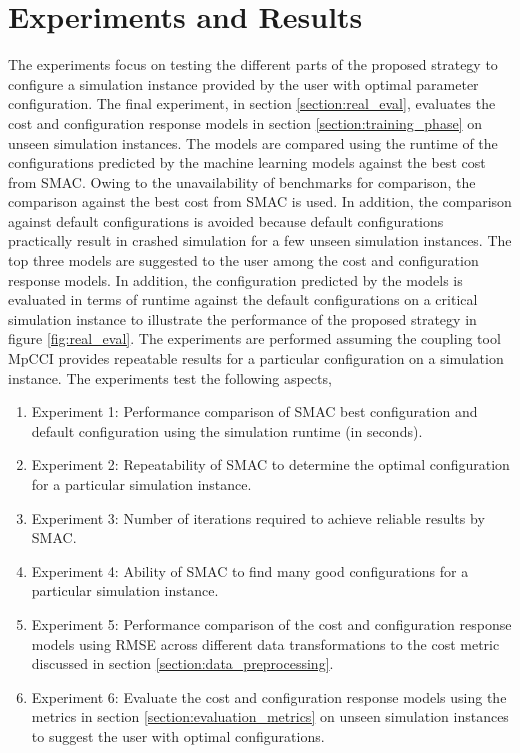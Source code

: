 \chapter{Experiments and Results}
\label{chapter:experimentation_results}
The experiments focus on testing the different parts of the proposed strategy to configure a simulation instance provided by the user with optimal parameter configuration.
The final experiment, in section \ref{section:real_eval}, evaluates the cost and configuration response models in section \ref{section:training_phase} on unseen simulation instances. The models are compared using the runtime of the configurations predicted by the machine learning models against the best cost from SMAC. Owing to the unavailability of benchmarks for comparison, the comparison against the best cost from SMAC is used. In addition, the comparison against default configurations is avoided because default configurations practically result in crashed simulation for a few unseen simulation instances. The top three models are suggested to the user among the cost and configuration response models. In addition, the configuration predicted by the models is evaluated in terms of runtime against the default configurations on a critical simulation instance to illustrate the performance of the proposed strategy in figure \ref{fig:real_eval}.
The experiments are performed assuming the coupling tool MpCCI provides repeatable results for a particular configuration on a simulation instance. The experiments test the following aspects,
\begin{enumerate}
    \item Experiment 1: Performance comparison of SMAC best configuration and default configuration using the simulation runtime (in seconds).
    \item Experiment 2: Repeatability of SMAC to determine the optimal configuration for a particular simulation instance.
    \item Experiment 3: Number of iterations required to achieve reliable results by SMAC.
    \item Experiment 4: Ability of SMAC to find many good configurations for a particular simulation instance.
    \item Experiment 5: Performance comparison of the cost and configuration response models using RMSE across different data transformations to the cost metric discussed in section \ref{section:data_preprocessing}.
    \item Experiment 6: Evaluate the cost and configuration response models using the metrics in section \ref{section:evaluation_metrics} on unseen simulation instances to suggest the user with optimal configurations. 
\end{enumerate}


